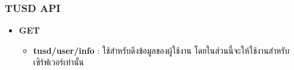 \subsubsection{TUSD API}

\ifenglish
\else
\begin{itemize}
    \item \textbf{GET}
    \begin{itemize}
        \item \textbf{tusd/user/info} : ใช้สำหรับดึงข้อมูลของผู้ใช้งาน โดยในส่วนนี้จะให้ใช้งานสำหรับเซิร์ฟเวอร์เท่านั้น
    \end{itemize}
\end{itemize}
\fi